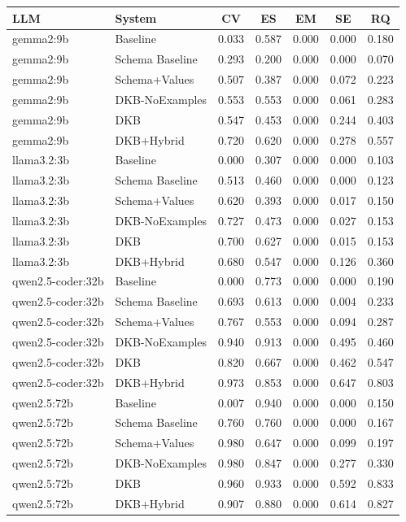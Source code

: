 \begin{tabular}{llccccc}
\toprule
LLM & System & CV & ES & EM & SE & RQ \\
\midrule
gemma2:9b & Baseline & 0.033 & 0.587 & 0.000 & 0.000 & 0.180 \\
gemma2:9b & Schema Baseline & 0.293 & 0.200 & 0.000 & 0.000 & 0.070 \\
gemma2:9b & Schema+Values & 0.507 & 0.387 & 0.000 & 0.072 & 0.223 \\
gemma2:9b & DKB-NoExamples & 0.553 & 0.553 & 0.000 & 0.061 & 0.283 \\
gemma2:9b & DKB & 0.547 & 0.453 & 0.000 & 0.244 & 0.403 \\
gemma2:9b & DKB+Hybrid & 0.720 & 0.620 & 0.000 & 0.278 & 0.557 \\
llama3.2:3b & Baseline & 0.000 & 0.307 & 0.000 & 0.000 & 0.103 \\
llama3.2:3b & Schema Baseline & 0.513 & 0.460 & 0.000 & 0.000 & 0.123 \\
llama3.2:3b & Schema+Values & 0.620 & 0.393 & 0.000 & 0.017 & 0.150 \\
llama3.2:3b & DKB-NoExamples & 0.727 & 0.473 & 0.000 & 0.027 & 0.153 \\
llama3.2:3b & DKB & 0.700 & 0.627 & 0.000 & 0.015 & 0.153 \\
llama3.2:3b & DKB+Hybrid & 0.680 & 0.547 & 0.000 & 0.126 & 0.360 \\
qwen2.5-coder:32b & Baseline & 0.000 & 0.773 & 0.000 & 0.000 & 0.190 \\
qwen2.5-coder:32b & Schema Baseline & 0.693 & 0.613 & 0.000 & 0.004 & 0.233 \\
qwen2.5-coder:32b & Schema+Values & 0.767 & 0.553 & 0.000 & 0.094 & 0.287 \\
qwen2.5-coder:32b & DKB-NoExamples & 0.940 & 0.913 & 0.000 & 0.495 & 0.460 \\
qwen2.5-coder:32b & DKB & 0.820 & 0.667 & 0.000 & 0.462 & 0.547 \\
qwen2.5-coder:32b & DKB+Hybrid & 0.973 & 0.853 & 0.000 & 0.647 & 0.803 \\
qwen2.5:72b & Baseline & 0.007 & 0.940 & 0.000 & 0.000 & 0.150 \\
qwen2.5:72b & Schema Baseline & 0.760 & 0.760 & 0.000 & 0.000 & 0.167 \\
qwen2.5:72b & Schema+Values & 0.980 & 0.647 & 0.000 & 0.099 & 0.197 \\
qwen2.5:72b & DKB-NoExamples & 0.980 & 0.847 & 0.000 & 0.277 & 0.330 \\
qwen2.5:72b & DKB & 0.960 & 0.933 & 0.000 & 0.592 & 0.833 \\
qwen2.5:72b & DKB+Hybrid & 0.907 & 0.880 & 0.000 & 0.614 & 0.827 \\
\bottomrule
\end{tabular}

